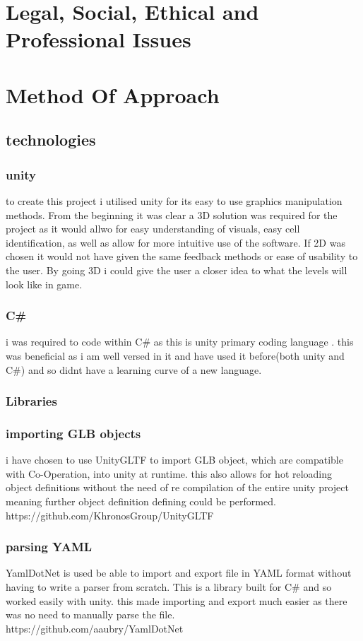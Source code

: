 \section{Legal, Social, Ethical and Professional Issues}

\section{Method Of Approach}

\subsection{technologies}
\subsubsection{unity}
to create this project i utilised unity for its easy to use graphics manipulation methods. From the beginning it was clear a 3D solution was required for the project as it would allwo for easy understanding of visuals, easy cell identification, as well as allow for more intuitive use of the software. If 2D was chosen it would not have given the same feedback methods or ease of usability to the user. By going 3D i could give the user a closer idea to what the levels will look like in game.
\subsubsection{C\#}
i was required to code within C\# as this is unity primary coding language . this was beneficial as i am well versed in it and have used it before(both unity and C\#) and so didnt have a learning curve of a new language.

\subsubsection{Libraries}
\subsubsection*{importing GLB objects}
i have chosen to use UnityGLTF to import GLB object, which are compatible with Co-Operation, into unity at runtime. this also allows for hot reloading object definitions without the need of re compilation of the entire unity project meaning further object definition defining could be performed.\\
https://github.com/KhronosGroup/UnityGLTF
\subsubsection*{parsing YAML}
YamlDotNet is used be able to import and export file in YAML format without having to write a parser from scratch. This is a library built for C\# and so worked easily with unity. this made importing and export much easier as there was no need to manually parse the file.\\
https://github.com/aaubry/YamlDotNet 
